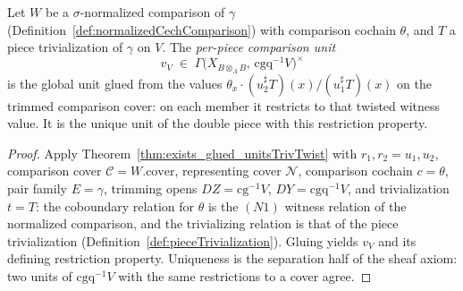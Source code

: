 \begin{theorem}
  \label{thm:pieceComparisonUnit}
  \leanok
  Let \(W\) be a \(\sigma\)-normalized comparison of \(\gamma\)
  (Definition~\ref{def:normalizedCechComparison}) with comparison cochain \(\theta\), and \(T\) a
  piece trivialization of \(\gamma\) on \(V\). The \emph{per-piece comparison unit}
  \[
    v_V \;\in\; \Gamma\bigl(X_{B \otimes_A B},\, \mathrm{cgq}^{-1}V\bigr)^{\times}
  \]
  is the global unit glued from the values \(\theta_x \cdot (u_2^{\sharp}T)(x) /
  (u_1^{\sharp}T)(x)\) on the trimmed comparison cover: on each member it restricts to that twisted
  witness value. It is the unique unit of the double piece with this restriction property.
\end{theorem}
\begin{proof}
  \leanok
  Apply Theorem~\ref{thm:exists_glued_unitsTrivTwist} with \(r_1, r_2 = u_1, u_2\), comparison
  cover \(\mathcal C = W.\mathrm{cover}\), representing cover \(\mathcal N\), comparison cochain
  \(c = \theta\), pair family \(E = \gamma\), trimming opens \(DZ = \mathrm{cg}^{-1}V\), \(DY =
  \mathrm{cgq}^{-1}V\), and trivialization \(t = T\): the coboundary relation for \(\theta\) is the
  \((N1)\) witness relation of the normalized comparison, and the trivializing relation is that of
  the piece trivialization (Definition~\ref{def:pieceTrivialization}). Gluing yields \(v_V\) and its
  defining restriction property. Uniqueness is the separation half of the sheaf axiom: two units of
  \(\mathrm{cgq}^{-1}V\) with the same restrictions to a cover agree.
\end{proof}

